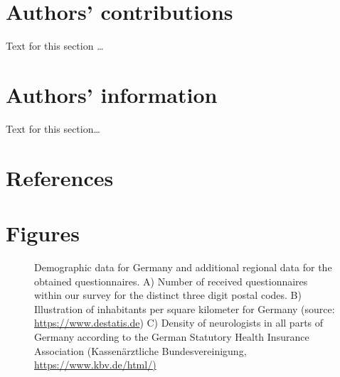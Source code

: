 \documentclass{bmcart}
\begin{document}
\begin{backmatter}
		\section*{Authors' contributions}
		Text for this section \ldots
		
		\section*{Authors' information}%
		Text for this section\ldots
		
		\section*{References}
		
		
		
		
\section*{Figures}
\begin{figure}[h!]
\caption{Demographic data for Germany and additional regional data for the obtained questionnaires. A) Number of received questionnaires within our survey for the distinct three digit postal codes. B) Illustration of inhabitants per square kilometer for Germany (source: \url{https://www.destatis.de}) C) Density of neurologists in all parts of Germany according to the German Statutory Health Insurance Association (Kassenärztliche Bundesvereinigung, \url{https://www.kbv.de/html/)}}
\end{figure}
		

\end{backmatter}
\end{document}
